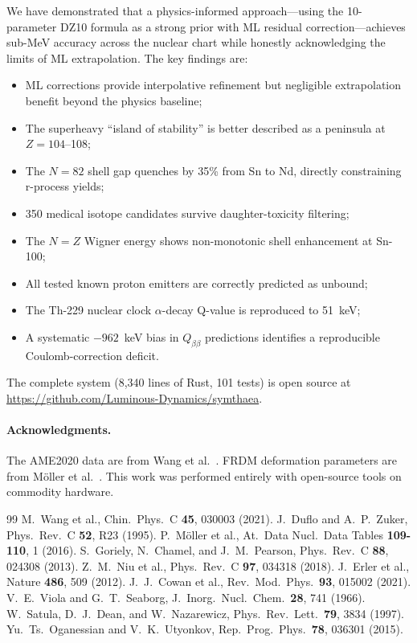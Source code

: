 \documentclass[twocolumn,letterpaper,10pt]{article}
\begin{document}
We have demonstrated that a physics-informed approach---using the
10-parameter DZ10 formula as a strong prior with ML residual
correction---achieves sub-MeV accuracy across the nuclear chart while
honestly acknowledging the limits of ML extrapolation. The key findings
are:
\begin{itemize}
\item ML corrections provide interpolative refinement but negligible
      extrapolation benefit beyond the physics baseline;
\item The superheavy ``island of stability'' is better described as a
      peninsula at $Z=104$--108;
\item The $N=82$ shell gap quenches by 35\% from Sn to Nd, directly
      constraining r-process yields;
\item 350 medical isotope candidates survive daughter-toxicity filtering;
\item The $N=Z$ Wigner energy shows non-monotonic shell enhancement at
      Sn-100;
\item All tested known proton emitters are correctly predicted as unbound;
\item The Th-229 nuclear clock $\alpha$-decay Q-value is reproduced to
      51~keV;
\item A systematic $-962$~keV bias in $Q_{\beta\beta}$ predictions
      identifies a reproducible Coulomb-correction deficit.
\end{itemize}

The complete system (8,340 lines of Rust, 101 tests) is open source at
\url{https://github.com/Luminous-Dynamics/symthaea}.

\paragraph{Acknowledgments.}
The AME2020 data are from Wang et al.~\cite{ame2020}. FRDM deformation
parameters are from M\"oller et al.~\cite{moller2016}. This work was
performed entirely with open-source tools on commodity hardware.



\begin{thebibliography}{99}
 M.~Wang et al., Chin.\ Phys.\ C \textbf{45}, 030003 (2021).
 J.~Duflo and A.~P.~Zuker, Phys.\ Rev.\ C \textbf{52}, R23 (1995).
 P.~M\"oller et al., At.\ Data Nucl.\ Data Tables \textbf{109-110}, 1 (2016).
 S.~Goriely, N.~Chamel, and J.~M.~Pearson, Phys.\ Rev.\ C \textbf{88}, 024308 (2013).
 Z.~M.~Niu et al., Phys.\ Rev.\ C \textbf{97}, 034318 (2018).
 J.~Erler et al., Nature \textbf{486}, 509 (2012).
 J.~J.~Cowan et al., Rev.\ Mod.\ Phys.\ \textbf{93}, 015002 (2021).
 V.~E.~Viola and G.~T.~Seaborg, J.\ Inorg.\ Nucl.\ Chem.\ \textbf{28}, 741 (1966).
 W.~Satula, D.~J.~Dean, and W.~Nazarewicz, Phys.\ Rev.\ Lett.\ \textbf{79}, 3834 (1997).
 Yu.~Ts.~Oganessian and V.~K.~Utyonkov, Rep.\ Prog.\ Phys.\ \textbf{78}, 036301 (2015).
\end{thebibliography}
\end{document}
